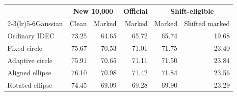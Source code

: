 \begin{tabular}{lrrrrr}\toprule
& \multicolumn{2}{c}{New 10,000} & Official & \multicolumn{2}{c}{Shift-eligible}\\
\cmidrule(lr){2-3}\cmidrule(lr){5-6}Gaussian & Clean & Marked & Marked & Marked & Shifted marked\\\midrule
Ordinary IDEC & 73.25 & 64.65 & 65.72 & 65.74 & 19.68\\
Fixed circle & 75.67 & 70.53 & 71.01 & 71.75 & 23.40\\
Adaptive circle & 75.91 & 70.65 & 71.11 & 71.50 & 23.84\\
Aligned ellipse & 76.10 & 70.98 & 71.42 & 71.84 & 23.56\\
Rotated ellipse & 74.45 & 69.09 & 69.28 & 69.90 & 23.29\\
\bottomrule\end{tabular}
